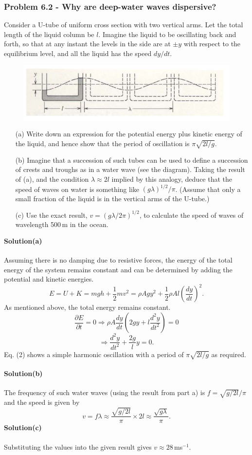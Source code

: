 \documentclass[12pt,a4paper]{article}
\begin{document}
\subsubsection*{Problem 6.2 - Why are deep-water waves dispersive?}
Consider a U-tube of uniform cross section with two vertical arms. Let the total length of the liquid column be $l$. Imagine the liquid to be oscillating back and forth, so that at any instant the levels in the side are at $\pm y$ with respect to the equilibrium level, and all the liquid has the speed $dy/dt$.
\begin{figure}[h]
    \centering
    \includegraphics[width=0.75\linewidth]{figs/fig_prob_6.2.png}
\end{figure}
\begin{enumerate}
    \item[(a)]Write down an expression for the potential energy plus kinetic energy of the liquid, and hence show that the period of oscillation is $\pi\sqrt{2l/g}$.
    \item[(b)]Imagine that a succession of such tubes can be used to define a succession of crests and troughs as in a water wave (see the diagram). Taking the result of (a), and the condition $\lambda\approx2l$ implied by this analogy, deduce that the speed of waves on water is something like $(g\lambda)^{1/2}/\pi$. (Assume that only a small fraction of the liquid is in the vertical arms of the U-tube.)
    \item[(c)]Use the exact result, $v=(g\lambda/2\pi)^{1/2}$, to calculate the speed of waves of wavelength 500\,m in the ocean.
\end{enumerate}
\textbf{Solution(a)}
\\
\\Assuming there is no damping due to resistive forces, the energy of the total energy of the system remains constant and can be determined by adding the potential and kinetic energies.
\[E=U+K=mgh+\frac{1}{2}mv^2=\rho Agy^2+\frac{1}{2}\rho Al\left(\frac{dy}{dt}\right)^2.\]
As mentioned above, the total energy remains constant.
\[\frac{\partial E}{\partial t}=0\Rightarrow\rho A\frac{dy}{dt}\left(2gy+l\frac{d^2y}{dt^2}\right)=0\]
\begin{equation}
    \Rightarrow\frac{d^2y}{dt^2}+\frac{2g}{l}y=0.
\end{equation}
Eq. (2) shows a simple harmonic oscillation with a period of $\pi\sqrt{2l/g}$ as required.
\\
\\\textbf{Solution(b)}
\\
\\The frequency of such water waves (using the result from part a) is $f=\sqrt{g/2l}/\pi$ and the speed is given by
\[v=f\lambda\approx\frac{\sqrt{g/2l}}{\pi}\times2l\approx\frac{\sqrt{g\lambda}}{\pi}.\]
\textbf{Solution(c)}
\\
\\Substituting the values into the given result gives $v\approx28$\,ms$^{-1}$.
\end{document}
